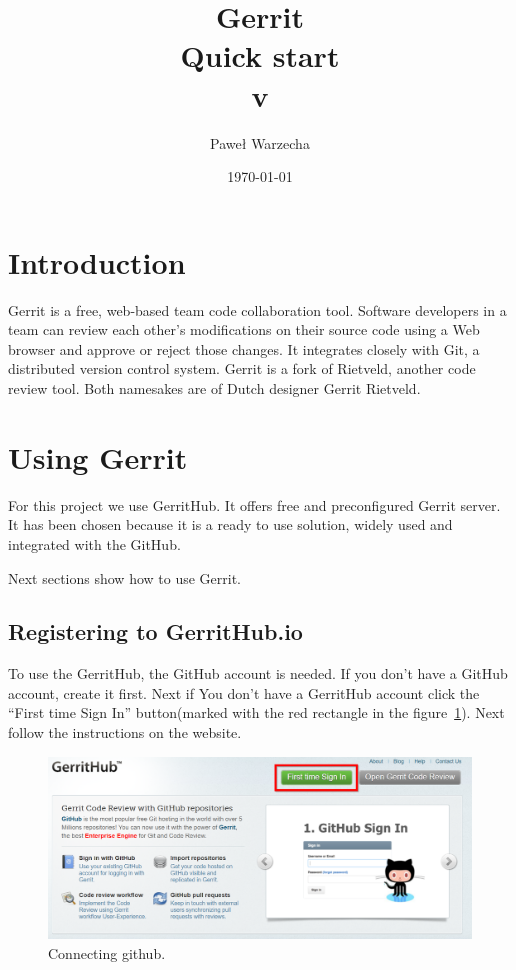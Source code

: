 \documentclass{article}
\title{Gerrit \\ Quick start \\ \small{v\version}}
\author{Paweł Warzecha}
\date{\today}
\begin{document}
\maketitle

\newpage

\section{Introduction}

Gerrit is a free, web-based team code collaboration tool. Software developers in a team can review each other's modifications on their source code using a Web browser and approve or reject those changes. It integrates closely with Git, a distributed version control system. Gerrit is a fork of Rietveld, another code review tool. Both namesakes are of Dutch designer Gerrit Rietveld.\cite{Gerrit}

\section{Using Gerrit}

For this project we use GerritHub\cite{GerritHub}. It offers free and preconfigured Gerrit server. It has been chosen because it is a ready to use solution, widely used and integrated with the GitHub. 

Next sections show how to use Gerrit.

\subsection{Registering to GerritHub.io}

To use the GerritHub, the GitHub account is needed. If you don't have a GitHub account, create it first. Next if You don't have a GerritHub account click the ``First time Sign In'' button(marked with the red rectangle in the figure~\ref{fig:Register}). Next follow the instructions on the website.

\begin{figure}[!ht]
  \centering
  \includegraphics[width=.75\textwidth]{img/RegisterToGerritHub}
  \caption{Connecting github.}
  \label{fig:Register}
\end{figure}
\end{document}
